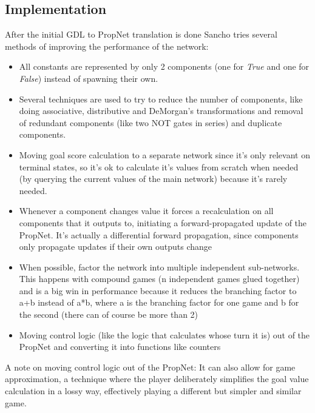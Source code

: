 \subsection{Implementation}
After the initial GDL to PropNet translation is done Sancho tries several methods of improving the performance of the network:
\begin{itemize}
	\item All constants are represented by only 2 components (one for \textit{True} and one for \textit{False}) instead of spawning their own.	
	
	\item Several techniques are used to try to reduce the number of components, like doing associative, distributive and DeMorgan's transformations and removal of redundant components (like two NOT gates in series) and duplicate components. 

	\item Moving goal score calculation to a separate network since it's only relevant on terminal states, so it's ok to calculate it's values from scratch when needed (by querying the current values of the main network) because it's rarely needed.
	
	\item Whenever a component changes value it forces a recalculation on all components that it outputs to,  initiating a forward-propagated update of the PropNet.
	It's actually a differential forward propagation, since components only propagate updates if their own outputs change
	
	\item When possible, factor the network into multiple independent sub-networks. This happens with compound games (n independent games glued together) and is a big win in performance because it reduces the branching factor to a+b instead of a*b, where a is the branching factor for one game and b for the second (there can of course be more than 2)
	
	\item Moving control logic (like the logic that calculates whose turn it is) out of the PropNet and converting it into functions like counters
	
\end{itemize}

A note on moving control logic out of the PropNet: It can also allow for game approximation, a technique where the player deliberately simplifies the goal value calculation in a lossy way, effectively playing a different but simpler and similar game.

